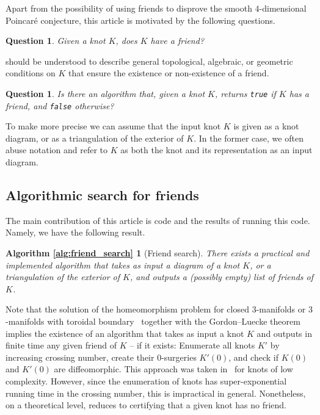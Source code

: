 \documentclass{amsart} %
\theoremstyle{thm}
\newtheorem{ques}[Theorem]{Question}
\newtheorem*{alg:friend_search}{Algorithm \ref{alg:friend_search}}
\theoremstyle{definition}
\numberwithin{equation}{section}
\begin{document}
 Apart from the possibility of using friends to disprove the smooth $4$-dimensional Poincaré conjecture, this article is motivated by the following questions.

\begin{ques} \label{ques:main}
  Given a knot $K$, does $K$ have a friend?
\end{ques}

 should be understood to describe general topological, algebraic, or geometric conditions on $K$ that ensure the existence or non-existence of a friend.

\begin{ques}\label{ques:decidable}
  Is there an algorithm that, given a knot $K$, returns \texttt{true} if $K$ has a friend, and \texttt{false} otherwise? 
\end{ques}

To make  more precise we can assume that the input knot $K$ is given as a knot diagram, or as a triangulation of the exterior of $K$. In the former case, we often abuse notation and refer to $K$ as both the knot and its representation as an input diagram.

\subsection{Algorithmic search for friends}

The main contribution of this article is code and the results of running this code. Namely, we have the following result.

\begin{alg:friend_search}[Friend search]
There exists a practical and implemented algorithm that takes as input a diagram of a knot $K$, or a triangulation of the exterior of $K$, and outputs a (possibly empty) list of friends of $K$.
\end{alg:friend_search}

Note that the solution of the homeomorphism problem for closed $3$-manifolds or $3$-manifolds with toroidal boundary~\cite{Kuperberg} together with the Gordon--Luecke theorem~\cite{Gordon_Luecke} implies the existence of an algorithm that takes as input a knot $K$ and outputs in finite time any given friend of $K$ -- if it exists: Enumerate all knots $K'$ by increasing crossing number, create their $0$-surgeries $K'(0)$, and check if $K(0)$ and $K'(0)$ are diffeomorphic. This approach was taken in~\cite{Kegel_Weiss} for knots of low complexity. However, since the enumeration of knots has super-exponential running time in the crossing number, this is impractical in general. Nonetheless, on a theoretical level,  reduces to certifying that a given knot has no friend.
\end{document}
